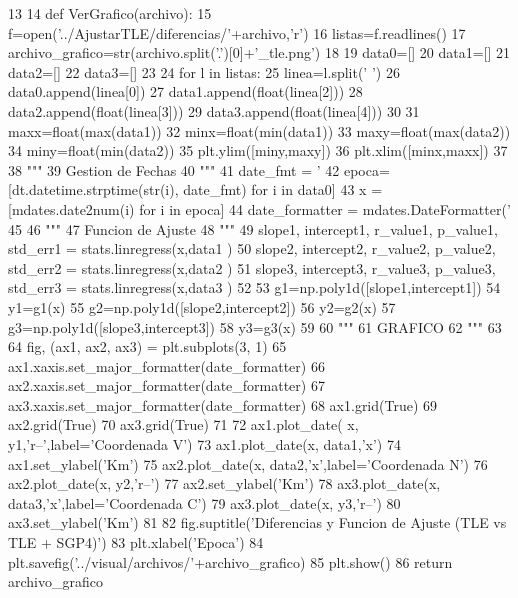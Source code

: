 \begin{DoxyCode}
13 
14 def VerGrafico(archivo):
15     f=open('../AjustarTLE/diferencias/'+archivo,'r')
16     listas=f.readlines()
17     archivo_grafico=str(archivo.split('.')[0]+'_tle.png')
18     
19     data0=[]
20     data1=[]
21     data2=[]
22     data3=[]
23     
24     for l in listas:
25         linea=l.split(' ')
26         data0.append(linea[0])
27         data1.append(float(linea[2]))
28         data2.append(float(linea[3]))
29         data3.append(float(linea[4]))
30         
31     maxx=float(max(data1))
32     minx=float(min(data1))
33     maxy=float(max(data2))
34     miny=float(min(data2))
35     plt.ylim([miny,maxy])
36     plt.xlim([minx,maxx])
37     
38     """
39     Gestion de Fechas
40     """
41     date_fmt = '%
42     epoca=[dt.datetime.strptime(str(i), date_fmt) for i in data0]
43     x = [mdates.date2num(i) for i in epoca]
44     date_formatter = mdates.DateFormatter('%
45     
46     """
47     Funcion de Ajuste
48     """
49     slope1, intercept1, r_value1, p_value1, std_err1 = stats.linregress(x,data1
      )
50     slope2, intercept2, r_value2, p_value2, std_err2 = stats.linregress(x,data2
      )
51     slope3, intercept3, r_value3, p_value3, std_err3 = stats.linregress(x,data3
      )
52     
53     g1=np.poly1d([slope1,intercept1])
54     y1=g1(x)
55     g2=np.poly1d([slope2,intercept2])
56     y2=g2(x)
57     g3=np.poly1d([slope3,intercept3])
58     y3=g3(x)
59     
60     """
61     GRAFICO
62     """
63      
64     fig, (ax1, ax2, ax3) = plt.subplots(3, 1)
65     ax1.xaxis.set_major_formatter(date_formatter)
66     ax2.xaxis.set_major_formatter(date_formatter)
67     ax3.xaxis.set_major_formatter(date_formatter)
68     ax1.grid(True)
69     ax2.grid(True)
70     ax3.grid(True)
71     
72     ax1.plot_date( x, y1,'r--',label='Coordenada V')
73     ax1.plot_date(x, data1,'x')
74     ax1.set_ylabel('Km')
75     ax2.plot_date(x, data2,'x',label='Coordenada N')
76     ax2.plot_date(x, y2,'r--')
77     ax2.set_ylabel('Km')
78     ax3.plot_date(x, data3,'x',label='Coordenada C')
79     ax3.plot_date(x, y3,'r--')
80     ax3.set_ylabel('Km')
81     
82     fig.suptitle('Diferencias y Funcion de Ajuste (TLE vs TLE + SGP4)')
83     plt.xlabel('Epoca')
84     plt.savefig('../visual/archivos/'+archivo_grafico)
85     plt.show()
86     
    return archivo_grafico\end{DoxyCode}
